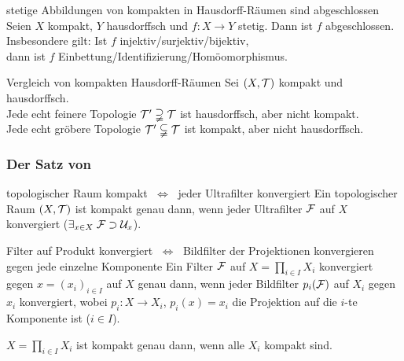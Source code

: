 \begin{Satz}{stetige Abbildungen von kompakten in Hausdorff-Räumen sind
             abgeschlossen} \\
    Seien $X$ kompakt, $Y$ hausdorffsch und $f\colon X \rightarrow Y$ stetig.
    Dann ist $f$ abgeschlossen. \\
    Insbesondere gilt:
    Ist $f$ injektiv/surjektiv/bijektiv, \\
    dann ist $f$ Einbettung/Identifizierung/Homöomorphismus.
\end{Satz}

\begin{Satz}{Vergleich von kompakten Hausdorff-Räumen}
    Sei $(X, \mathcal{T})$ kompakt und hausdorffsch. \\
    Jede echt feinere Topologie $\mathcal{T}' \supsetneqq \mathcal{T}$ ist hausdorffsch,
    aber nicht kompakt. \\
    Jede echt gröbere Topologie $\mathcal{T}' \subsetneqq \mathcal{T}$ ist kompakt,
    aber nicht hausdorffsch.
\end{Satz}

\subsubsection{%
    Der Satz von %
}

\begin{Satz}{topologischer Raum kompakt $\;\Leftrightarrow\;$
             jeder Ultrafilter konvergiert}
    Ein topologischer Raum $(X, \mathcal{T})$ ist kompakt genau dann, wenn
    jeder Ultrafilter $\mathcal{F}$ auf $X$ konvergiert
    ($\exists_{x \in X}\; \mathcal{F} \supset \mathcal{U}_x$).
\end{Satz}

\begin{Lemma}{Filter auf Produkt konvergiert $\;\Leftrightarrow\;$
              Bildfilter der Projektionen konvergieren gegen
              jede einzelne Komponente}
    Ein Filter $\mathcal{F}$ auf $X = \prod_{i \in I} X_i$ konvergiert gegen
    $x = (x_i)_{i \in I}$ auf $X$ genau dann, wenn jeder
    Bildfilter $p_i(\mathcal{F})$ auf $X_i$ gegen $x_i$ konvergiert, wobei
    $p_i\colon X \rightarrow X_i$, $p_i(x) = x_i$
    die Projektion auf die $i$-te Komponente ist ($i \in I$).
\end{Lemma}

\begin{Satz}{}
    $X = \prod_{i \in I} X_i$ ist kompakt genau dann, wenn alle $X_i$ kompakt
    sind.
\end{Satz}

